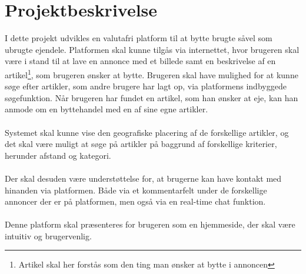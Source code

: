 \chapter{Projektbeskrivelse}\label{ch:Projektbeskrivelse}
I dette projekt udvikles en valutafri platform til at bytte brugte såvel som ubrugte ejendele. Platformen skal kunne tilgås via internettet, hvor brugeren skal være i stand til at lave en annonce med et billede samt en beskrivelse af en artikel\footnote{Artikel skal her forstås som den ting man ønsker at bytte i annoncen}, som brugeren ønsker at bytte. Brugeren skal have mulighed for at kunne søge efter artikler, som andre brugere har lagt op, via platformens indbyggede søgefunktion. Når brugeren har fundet en artikel, som han ønsker at eje, kan han anmode om en byttehandel med en af sine egne artikler. \\ \\ \noindent
Systemet skal kunne vise den geografiske placering af de forskellige artikler, og det skal være muligt at søge på artikler på baggrund af forskellige kriterier, herunder afstand og kategori. \\ \\ \noindent    
Der skal desuden være understøttelse for, at brugerne kan have kontakt med hinanden via platformen. Både via et kommentarfelt under de forskellige annoncer der er på platformen, men også via en real-time chat funktion. \\ \\ \noindent
\noindent Denne platform skal præsenteres for brugeren som en hjemmeside, der skal være intuitiv og brugervenlig. 

